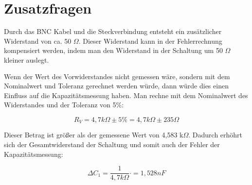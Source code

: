 \section{Zusatzfragen}

Durch das BNC Kabel und die Steckverbindung entsteht ein zusätzlicher 
Widerstand von ca. 50 $\Omega$. Dieser Widerstand kann in der Fehlerrechnung
kompensiert werden, indem man den Widerstand in der Schaltung um 50 $\Omega$
kleiner auslegt.

Wenn der Wert des Vorwiderstandes nicht gemessen wäre, sondern mit dem
Nominalwert und Toleranz gerechnet werden würde, dann würde dies einen
Einfluss auf die Kapazitätsmessung haben. Man rechne mit dem Nominalwert
des Widerstandes und der Toleranz von 5\%:

\[
	R_{V} = 4,7 k\Omega \pm 5\% = 4,7 k\Omega \pm 235 \Omega
\]

Dieser Betrag ist größer als der gemessene Wert von 4,583 k$\Omega$.
Dadurch erhöhrt sich der Gesamtwiderstand der Schaltung und somit
auch der Fehler der Kapazitätsmessung:

\[
	\Delta C_1 = \frac{1}{4,7 k\Omega} \cdot  = 1,528 nF
\]
